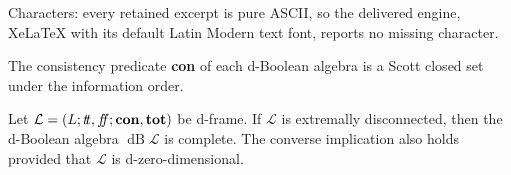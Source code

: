 \documentclass[10pt,a4paper]{amsart}
\DeclareMathOperator{\dB}{dB}
\newcommand{\dbf}{{f\!\!f}}
\newcommand{\dbt}{{t\!t}}
\begin{document}
Characters: every retained excerpt is pure ASCII, so the delivered engine, XeLaTeX with its default Latin Modern text font, reports no missing character.
\begin{cor}\label{dBA via order reversing} The consistency predicate {\bf con} of each d-Boolean algebra is a Scott closed set under the information order. \end{cor} 

\begin{lem} \label{complete dBA vs extremal discon} Let $\mathcal{L}=(L;\dbt,\dbf;{\bf con},{\bf tot})$ be  d-frame.   If  $\mathcal{L}$  is extremally disconnected, then the d-Boolean algebra $\dB\mathcal{L}$ is complete.
The converse implication also holds provided that   $\mathcal{L}$ is d-zero-dimensional.  
\end{lem}
\end{document}
